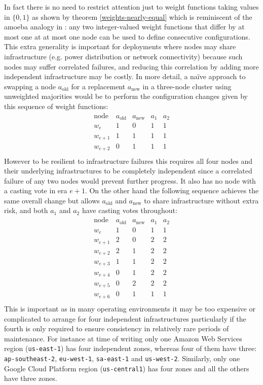 \documentclass[journal]{IEEEtran}
\begin{document}
In fact there is no need to restrict attention just to weight functions taking
values in $\{0, 1\}$ as shown by theorem \ref{weights-nearly-equal} which is
reminiscent of the amoeba analogy in \cite{cheap-paxos}: any two integer-valued
weight functions that differ by at most one at at most one node can be used to
define consecutive configurations. This extra generality is important for
deployments where nodes may share infrastructure (e.g. power distribution or
network connectivity) because such nodes may suffer correlated failures, and
reducing this correlation by adding more independent infrastructure may be
costly.  In more detail, a na\"ive approach to swapping a node
$a_{\textrm{old}}$ for a replacement $a_{\textrm{new}}$ in a three-node cluster
using unweighted majorities would be to perform the configuration changes given
by this sequence of weight functions: \[\begin{array}{rcccc}
%
\textrm{node}&a_{\textrm{old}}&a_{\textrm{new}}&a_1&a_2 \\
%
w_e&1&0&1&1\\
%
w_{e+1}&1&1&1&1\\
%
w_{e+2}&0&1&1&1\\
%
\end{array}\]
%
However to be resilient to infrastructure failures this requires all four nodes
and their underlying infrastructures to be completely independent since a
correlated failure of any two nodes would prevent further progress.  It also
has no node with a casting vote in era $e+1$. On the other hand the following
sequence achieves the same overall change but allows $a_{\textrm{old}}$ and
$a_{\textrm{new}}$ to share infrastructure without extra risk, and both $a_1$
and $a_2$ have casting votes throughout: \[\begin{array}{rcccc}
%
\textrm{node}&a_{\textrm{old}}&a_{\textrm{new}}&a_1&a_2 \\
%
w_e&1&0&1&1\\
%
w_{e+1}&2&0&2&2\\
%
w_{e+2}&2&1&2&2\\
%
w_{e+3}&1&1&2&2\\
%
w_{e+4}&0&1&2&2\\
%
w_{e+5}&0&2&2&2\\
%
w_{e+6}&0&1&1&1\\
%
\end{array}\]
%
This is important as in many operating environments it may be too expensive or
complicated to arrange for four independent infrastructures particularly if the
fourth is only required to ensure consistency in relatively rare periods of
maintenance. For instance at time of writing only one Amazon Web Services
region (\texttt{us-east-1}) has four independent zones, whereas four of them
have three: \texttt{ap-southeast-2}, \texttt{eu-west-1}, \texttt{sa-east-1} and
\texttt{us-west-2}. Similarly, only one Google Cloud Platform region
(\texttt{us-central1}) has four zones and all the others have three zones.
\end{document}
